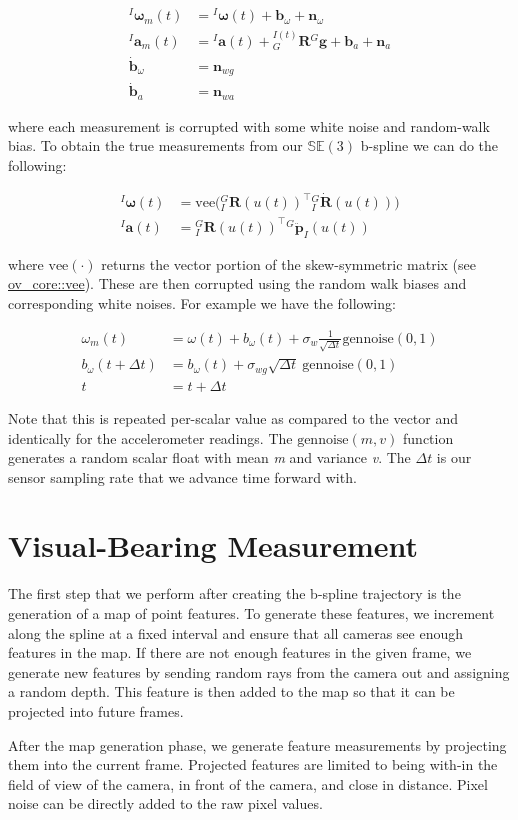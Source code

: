 \begin{align*} {}^I\boldsymbol{\omega}_m(t) &= {}^I\boldsymbol{\omega}(t) + \mathbf{b}_\omega + \mathbf{n}_\omega \\ {}^I\mathbf{a}_m(t) &= {}^I\mathbf{a}(t) + {}^{I(t)}_G\mathbf{R}{}^G\mathbf{g} + \mathbf{b}_a + \mathbf{n}_a \\ \dot{\mathbf{b}}_\omega &= \mathbf{n}_{wg} \\ \dot{\mathbf{b}}_a &= \mathbf{n}_{wa} \end{align*}

where each measurement is corrupted with some white noise and random-\/walk bias. To obtain the true measurements from our $\mathbb{SE}(3)$ b-\/spline we can do the following\+:

\begin{align*} {}^I\boldsymbol{\omega}(t) &= \mathrm{vee}\Big( {}^{G}_{I}\mathbf{R}(u(t))^\top {}^{G}_{I}\dot{\mathbf{R}}(u(t)) \Big) \\ {}^I\mathbf{a}(t) &= {}^{G}_{I}\mathbf{R}(u(t))^\top {}^{G}\ddot{\mathbf{p}}_{I}(u(t)) \end{align*}

where $\mathrm{vee}(\cdot)$ returns the vector portion of the skew-\/symmetric matrix (see \hyperlink{namespaceov__core_aaf2593d3bde63e31ac9fc20e345271dc}{ov\+\_\+core\+::vee}). These are then corrupted using the random walk biases and corresponding white noises. For example we have the following\+:

\begin{align*} \omega_m(t) &= \omega(t) + b_\omega(t) + \sigma_w\frac{1}{\sqrt{\Delta t}}\textrm{gennoise}(0,1) \\ b_\omega(t+\Delta t) &= b_\omega(t) + \sigma_{wg}\sqrt{\Delta t}~\textrm{gennoise}(0,1) \\ t &= t+\Delta t \end{align*}

Note that this is repeated per-\/scalar value as compared to the vector and identically for the accelerometer readings. The $\textrm{gennoise}(m,v)$ function generates a random scalar float with mean {\itshape m} and variance {\itshape v}. The $\Delta t$ is our sensor sampling rate that we advance time forward with.\hypertarget{simulation_sim-visbearing}{}\section{Visual-\/\+Bearing Measurement}\label{simulation_sim-visbearing}
The first step that we perform after creating the b-\/spline trajectory is the generation of a map of point features. To generate these features, we increment along the spline at a fixed interval and ensure that all cameras see enough features in the map. If there are not enough features in the given frame, we generate new features by sending random rays from the camera out and assigning a random depth. This feature is then added to the map so that it can be projected into future frames.

After the map generation phase, we generate feature measurements by projecting them into the current frame. Projected features are limited to being with-\/in the field of view of the camera, in front of the camera, and close in distance. Pixel noise can be directly added to the raw pixel values. 